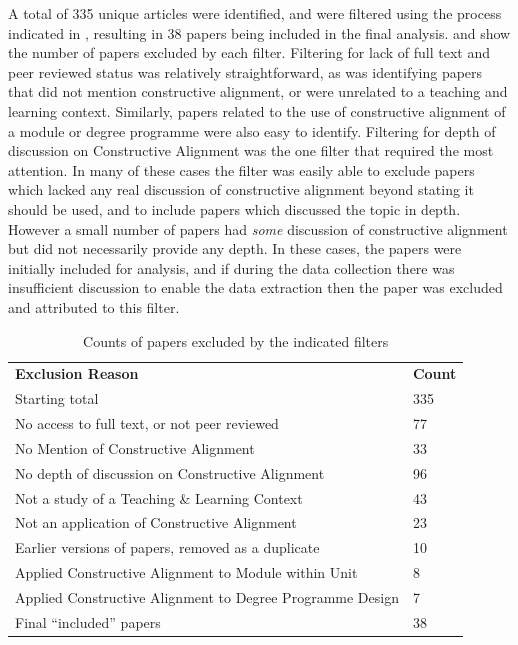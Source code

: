 A total of 335 unique articles were identified, and were filtered using the process indicated in , resulting in 38 papers being included in the final analysis.  and  show the number of papers excluded by each filter. Filtering for lack of full text and peer reviewed status was relatively straightforward, as was identifying papers that did not mention constructive alignment, or were unrelated to a teaching and learning context. Similarly, papers related to the use of constructive alignment of a module or degree programme were also easy to identify. Filtering for depth of discussion on Constructive Alignment was the one filter that required the most attention. In many of these cases the filter was easily able to exclude papers which lacked any real discussion of constructive alignment beyond stating it should be used, and to include papers which discussed the topic in depth. However a small number of papers had \emph{some} discussion of constructive alignment but did not necessarily provide any depth. In these cases, the papers were initially included for analysis, and if during the data collection there was insufficient discussion to enable the data extraction then the paper was excluded and attributed to this filter.

\begin{table}[p]
	\centering
	\caption{Counts of papers excluded by the indicated filters}
	\label{tbl:exclude_reason}
	\footnotesize
    \begin{tabular}{l|l}
    \textbf{Exclusion Reason} & \textbf{Count} \\
    Starting total & 335 \\
    \hline
    No access to full text, or not peer reviewed & 77 \\
    No Mention of Constructive Alignment & 33 \\
    No depth of discussion on Constructive Alignment & 96 \\
    Not a study of a Teaching \& Learning Context & 43 \\
    Not an application of Constructive Alignment & 23 \\
    Earlier versions of papers, removed as a duplicate & 10 \\
    Applied Constructive Alignment to Module within Unit & 8 \\
    Applied Constructive Alignment to Degree Programme Design & 7 \\ \hline
    Final ``included'' papers & 38 \\
    \end{tabular}
\end{table}

